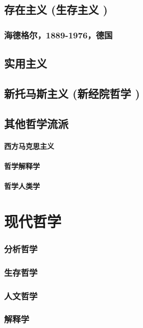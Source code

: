 \documentclass[UTF8]{../RepresentationUniverse}
\begin{document}
\section{存在主义 (生存主义 )}

    \subsection{海德格尔，1889-1976，德国}




    \section{实用主义}
    \section{新托马斯主义 (新经院哲学 )}
    \section{其他哲学流派}
        \subsubsection{西方马克思主义}
        \subsubsection{哲学解释学}
        \subsubsection{哲学人类学}
    

\chapter{现代哲学}
    \subsection{分析哲学}




    \subsection{生存哲学}
    \subsection{人文哲学}
    \subsection{解释学}
\end{document}
